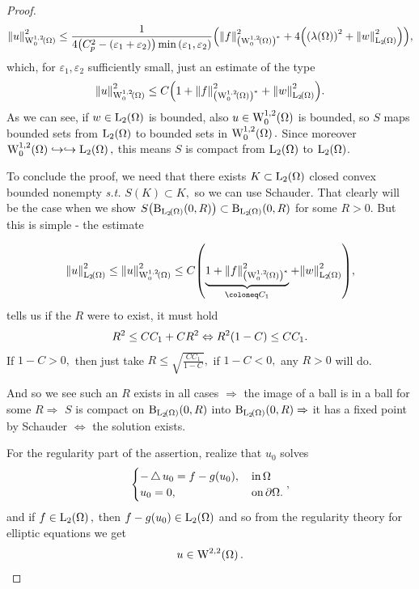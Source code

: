 \documentclass{article}
\begin{document}
\begin{example}
\begin{proof}
\[
	\norm{u}_{\WkpzeroSet[1][2]{\Omega}}^{2} \leq \frac{1}{4\qty(C_p^{2} - \qty(\varepsilon_1 + \varepsilon_2))\min\qty(\varepsilon_1, \varepsilon_2)}\qty(\norm{f}_{\qty(\WkpzeroSet[1][2]{\Omega})^{*}}^{2}+ 4\qty(\qty(\lambda\qty(\Omega))^{2}+\norm{w}_{\LpSet[2]{\Omega}}^{2})),
\]
which, for $\varepsilon_1, \varepsilon_2$ sufficiently small, just an estimate of the type
\[
	\norm{u}_{\WkpzeroSet[1][2]{\Omega}}^{2} \leq C\qty(1+\norm{f}_{\qty(\WkpzeroSet[1][2]{\Omega})^{*}}^{2} + \norm{w}_{\LpSet[2]{\Omega}}^{2}).
\]
As we can see, if $w \in \LpSet[2]{\Omega}$ is bounded, also $u \in \WkpzeroSet[1][2]{\Omega}$ is bounded, so $S$ maps bounded sets from $\LpSet[2]{\Omega}$ to bounded sets in $\WkpzeroSet[1][2]{\Omega}.$ Since moreover $\WkpzeroSet[1][2]{\Omega} \hookrightarrow \hookrightarrow \LpSet[2]{\Omega}, $ this means $S$ is compact from $\LpSet[2]{\Omega}$ to $\LpSet[2]{\Omega}$.

To conclude the proof, we need that there exists $K \subset \LpSet[2]{\Omega}$ closed convex bounded nonempty \textit{s.t.} $S(K) \subset K,$ so we can use Schauder. That clearly will be the case when we show $S\qty(\text{B}_{\LpSet[2]{\Omega}}(0,R)) \subset \text{B}_{\LpSet[2]{\Omega}}(0,R)$ for some $R>0.$ But this is simple - the estimate

\[
	\norm{u}_{\LpSet[2]{\Omega}}^{2} \leq \norm{u}_{\WkpzeroSet[1][2]{\Omega}}^{2} \leq C\qty(\underbrace{1+\norm{f}_{\qty(\WkpzeroSet[1][2]{\Omega})^{*}}^{2}}_{\coloneq C_1} + \norm{w}_{\LpSet[2]{\Omega}}^{2}),
\]
tells us if the $R$ were to exist, it must hold
\[
	R^{2} \leq C C_1 + C R^{2} \Leftrightarrow R^{2}\qty(1-C)\leq C C_1.
\]
If $1-C >0,$ then just take $R \leq \sqrt{\frac{C C_1}{1-C}},$ if $1-C <0,$ any $R>0$ will do.

And so we see such an $R$ exists in all cases  $\Rightarrow$ the image of a ball is in a ball for some $R \Rightarrow$ $S$ is compact on $\text{B}_{\LpSet[2]{\Omega}}(0,R)$ into $\text{B}_{\LpSet[2]{\Omega}}(0,R) \Rightarrow $ it has a fixed point by Schauder $\Leftrightarrow$ the solution exists.

For the regularity part of the assertion, realize that $u_0$ solves 
\[
	\begin{cases}
		-\operatorname{\bigtriangleup} u_0 = f-g(u_0), & \, \text{in} \, \Omega \\
		u_0 = 0, & \, \text{on} \, \partial \Omega. 
	\end{cases},
\]
and if $f \in \LpSet[2]{\Omega},$ then $f-g\qty(u_0) \in \LpSet[2]{\Omega}$ and so from the regularity theory for elliptic equations we get
\[
	u \in \WkpSet[2][2]{\Omega}.
\]
\end{proof}


\end{example}
\end{document}

